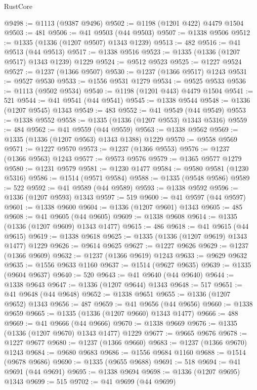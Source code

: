 \begin{lexlean}{RustCore}
\begin{coremodule}
@9498 := @1113 (@9387 @9496)
@9502 := @1198 (@1201 @422) @4479 @1504
@9503 := 481
@9506 := @41 @9503 (@44 @9503)
@9507 := @1338 @9506
@9512 := @1335 (@1336 (@1207 @9507) @1343 @1239)
@9513 := 482
@9516 := @41 @9513 (@44 @9513)
@9517 := @1338 @9516
@9523 := @1335 (@1336 (@1207 @9517) @1343 @1239) @1229
@9524 := @9512 @9523
@9525 := @1227 @9524
@9527 := @1237 (@1366 @9507)
@9530 := @1237 (@1366 @9517) @1243
@9531 := @9527 @9530
@9533 := @1556 @9531 @1279
@9534 := @9525 @9533
@9536 := @1113 (@9502 @9534)
@9540 := @1198 (@1201 @443) @4479 @1504
@9541 := 521
@9544 := @41 @9541 (@44 @9541)
@9545 := @1338 @9544
@9548 := @1336 (@1207 @9545) @1343
@9549 := 483
@9552 := @41 @9549 (@44 @9549)
@9553 := @1338 @9552
@9558 := @1335 (@1336 (@1207 @9553) @1343 @5316)
@9559 := 484
@9562 := @41 @9559 (@44 @9559)
@9563 := @1338 @9562
@9569 := @1335 (@1336 (@1207 @9563) @1343 @1388) @1229
@9570 := @9558 @9569
@9571 := @1227 @9570
@9573 := @1237 (@1366 @9553)
@9576 := @1237 (@1366 @9563) @1243
@9577 := @9573 @9576
@9579 := @1365 @9577 @1279
@9580 := @1231 @9579
@9581 := @1230 @1477
@9584 := @9580 @9581 (@1230 @5316)
@9586 := @1514 (@9571 @9584)
@9588 := @1335 (@9548 @9586)
@9589 := 522
@9592 := @41 @9589 (@44 @9589)
@9593 := @1338 @9592
@9596 := @1336 (@1207 @9593) @1343
@9597 := 519
@9600 := @41 @9597 (@44 @9597)
@9601 := @1338 @9600
@9604 := @1336 (@1207 @9601) @1343
@9605 := 485
@9608 := @41 @9605 (@44 @9605)
@9609 := @1338 @9608
@9614 := @1335 (@1336 (@1207 @9609) @1343 @1477)
@9615 := 486
@9618 := @41 @9615 (@44 @9615)
@9619 := @1338 @9618
@9625 := @1335 (@1336 (@1207 @9619) @1343 @1477) @1229
@9626 := @9614 @9625
@9627 := @1227 @9626
@9629 := @1237 (@1366 @9609)
@9632 := @1237 (@1366 @9619) @1243
@9633 := @9629 @9632
@9635 := @1556 @9633 @1160
@9637 := @1514 (@9627 @9635)
@9639 := @1335 (@9604 @9637)
@9640 := 520
@9643 := @41 @9640 (@44 @9640)
@9644 := @1338 @9643
@9647 := @1336 (@1207 @9644) @1343
@9648 := 517
@9651 := @41 @9648 (@44 @9648)
@9652 := @1338 @9651
@9655 := @1336 (@1207 @9652) @1343
@9656 := 487
@9659 := @41 @9656 (@44 @9656)
@9660 := @1338 @9659
@9665 := @1335 (@1336 (@1207 @9660) @1343 @1477)
@9666 := 488
@9669 := @41 @9666 (@44 @9666)
@9670 := @1338 @9669
@9676 := @1335 (@1336 (@1207 @9670) @1343 @1477) @1229
@9677 := @9665 @9676
@9678 := @1227 @9677
@9680 := @1237 (@1366 @9660)
@9683 := @1237 (@1366 @9670) @1243
@9684 := @9680 @9683
@9686 := @1556 @9684 @1160
@9688 := @1514 (@9678 @9686)
@9690 := @1335 (@9655 @9688)
@9691 := 518
@9694 := @41 @9691 (@44 @9691)
@9695 := @1338 @9694
@9698 := @1336 (@1207 @9695) @1343
@9699 := 515
@9702 := @41 @9699 (@44 @9699)

\end{coremodule}
\end{lexlean}
